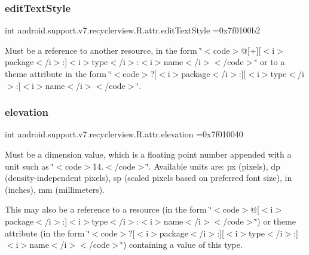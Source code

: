 \subsubsection{\texorpdfstring{edit\+Text\+Style}{editTextStyle}}
{\footnotesize\ttfamily int android.\+support.\+v7.\+recyclerview.\+R.\+attr.\+edit\+Text\+Style =0x7f0100b2\hspace{0.3cm}{\ttfamily [static]}}

Must be a reference to another resource, in the form \char`\"{}$<$code$>$@\mbox{[}+\mbox{]}\mbox{[}$<$i$>$package$<$/i$>$\+:\mbox{]}$<$i$>$type$<$/i$>$\+:$<$i$>$name$<$/i$>$$<$/code$>$\char`\"{} or to a theme attribute in the form \char`\"{}$<$code$>$?\mbox{[}$<$i$>$package$<$/i$>$\+:\mbox{]}\mbox{[}$<$i$>$type$<$/i$>$\+:\mbox{]}$<$i$>$name$<$/i$>$$<$/code$>$\char`\"{}. \mbox{\label{classandroid_1_1support_1_1v7_1_1recyclerview_1_1R_1_1attr_ae22f31865d59869b52d58f378c23859b}} 
\subsubsection{\texorpdfstring{elevation}{elevation}}
{\footnotesize\ttfamily int android.\+support.\+v7.\+recyclerview.\+R.\+attr.\+elevation =0x7f010040\hspace{0.3cm}{\ttfamily [static]}}

Must be a dimension value, which is a floating point number appended with a unit such as \char`\"{}$<$code$>$14.\+5sp$<$/code$>$\char`\"{}. Available units are\+: px (pixels), dp (density-\/independent pixels), sp (scaled pixels based on preferred font size), in (inches), mm (millimeters). 

This may also be a reference to a resource (in the form \char`\"{}$<$code$>$@\mbox{[}$<$i$>$package$<$/i$>$\+:\mbox{]}$<$i$>$type$<$/i$>$\+:$<$i$>$name$<$/i$>$$<$/code$>$\char`\"{}) or theme attribute (in the form \char`\"{}$<$code$>$?\mbox{[}$<$i$>$package$<$/i$>$\+:\mbox{]}\mbox{[}$<$i$>$type$<$/i$>$\+:\mbox{]}$<$i$>$name$<$/i$>$$<$/code$>$\char`\"{}) containing a value of this type. \mbox{\label{classandroid_1_1support_1_1v7_1_1recyclerview_1_1R_1_1attr_aa8e357728067c438e31fa8011f19b027}} 
